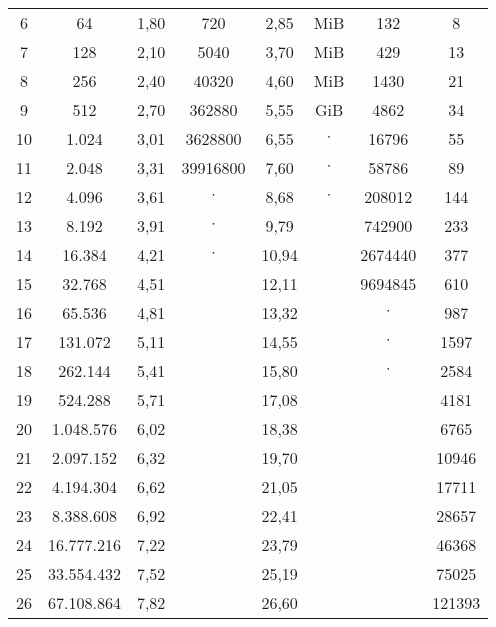 \documentclass[a4paper,oneside,12pt]{article}
\newenvironment{description*}%
{
\begin{description}
\setlength{\itemsep}{0pt}
\setlength{\parskip}{2pt}
}
{\end{description}}
\begin{document}
\begin{description*}
\begin{tabular}[h]{|c|c|c|c|c|c|c|c|}
        6 &            64 & 1,80 & 720      &  2,85 & \unit[3,8]{MiB} & 132     & 8 \\
        7 &           128 & 2,10 & 5040     &  3,70 & \unit[38]{MiB}  & 429     & 13 \\
        8 &           256 & 2,40 & 40320    &  4,60 & \unit[380]{MiB} & 1430    & 21 \\
        9 &           512 & 2,70 & 362880   &  5,55 & \unit[3,7]{GiB} & 4862    & 34 \\
       10 &         1.024 & 3,01 & 3628800  &  6,55 & $\cdot$         & 16796   & 55 \\
       11 &         2.048 & 3,31 & 39916800 &  7,60 & $\cdot$         & 58786   & 89 \\
       12 &         4.096 & 3,61 & $\cdot$  &  8,68 & $\cdot$         & 208012  & 144 \\
       13 &         8.192 & 3,91 & $\cdot$  &  9,79 &                 & 742900  & 233 \\
       14 &        16.384 & 4,21 & $\cdot$  & 10,94 &                 & 2674440 & 377 \\
       15 &        32.768 & 4,51 &          & 12,11 &                 & 9694845 & 610 \\
       16 &        65.536 & 4,81 &          & 13,32 &                 & $\cdot$ & 987 \\
       17 &       131.072 & 5,11 &          & 14,55 &                 & $\cdot$ & 1597 \\
       18 &       262.144 & 5,41 &          & 15,80 &                 & $\cdot$ & 2584 \\
       19 &       524.288 & 5,71 &          & 17,08 &                 &         & 4181 \\
       20 &     1.048.576 & 6,02 &          & 18,38 &                 &         & 6765 \\
       21 &     2.097.152 & 6,32 &          & 19,70 &                 &         & 10946 \\
       22 &     4.194.304 & 6,62 &          & 21,05 &                 &         & 17711 \\
       23 &     8.388.608 & 6,92 &          & 22,41 &                 &         & 28657 \\
       24 &    16.777.216 & 7,22 &          & 23,79 &                 &         & 46368 \\
       25 &    33.554.432 & 7,52 &          & 25,19 &                 &         & 75025 \\
       26 &    67.108.864 & 7,82 &          & 26,60 &                 &         & 121393 \\

\end{tabular}
\end{description*}
\end{document}

